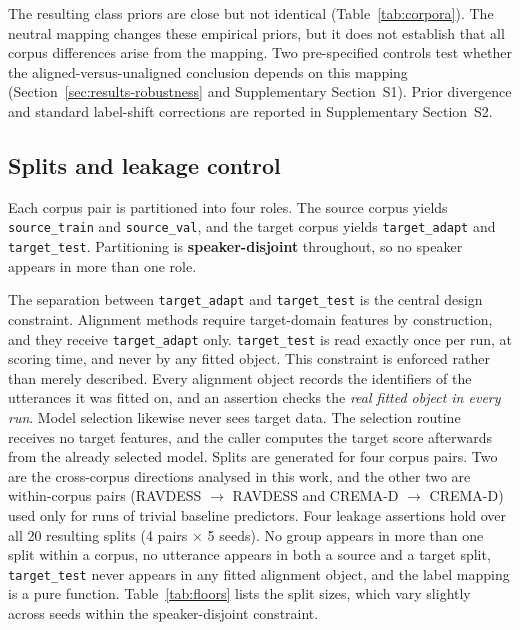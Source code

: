 The resulting class priors are close but not identical
(Table~\ref{tab:corpora}). The neutral mapping changes these empirical priors,
but it does not establish that all corpus differences arise from the mapping.
Two pre-specified controls test whether the aligned-versus-unaligned conclusion
depends on this mapping (Section~\ref{sec:results-robustness} and Supplementary
Section~S1). Prior divergence and standard label-shift corrections are reported
in Supplementary Section~S2.

\subsection{Splits and leakage control}
\label{sec:splits}

Each corpus pair is partitioned into four roles. The source corpus yields
\texttt{source\_train} and \texttt{source\_val}, and the target corpus yields
\texttt{target\_adapt} and \texttt{target\_test}. Partitioning is
\textbf{speaker-disjoint} throughout, so no speaker appears in more than one
role.

The separation between \texttt{target\_adapt} and \texttt{target\_test} is the
central design constraint. Alignment methods require target-domain features by
construction, and they receive \texttt{target\_adapt} only.
\texttt{target\_test} is read exactly once per run, at scoring time, and never
by any fitted object. This constraint is enforced rather than merely described.
Every alignment object records the identifiers of the utterances it was fitted
on, and an assertion checks the \emph{real fitted object in every run}. Model
selection likewise never sees target data. The selection routine receives no
target features, and the caller computes the target score afterwards from the
already selected model. Splits are generated for four corpus pairs. Two are
the cross-corpus directions analysed in this work, and the other two are
within-corpus pairs (RAVDESS $\rightarrow$ RAVDESS and CREMA-D $\rightarrow$
CREMA-D) used only for runs of trivial baseline predictors. Four leakage
assertions hold over all 20 resulting splits (4 pairs $\times$ 5 seeds). No
group appears in more than one split within a corpus, no utterance appears in both a source and a target split,
\texttt{target\_test} never appears in any fitted alignment object, and the
label mapping is a pure function. Table~\ref{tab:floors} lists the split sizes,
which vary slightly across seeds within the speaker-disjoint constraint.




